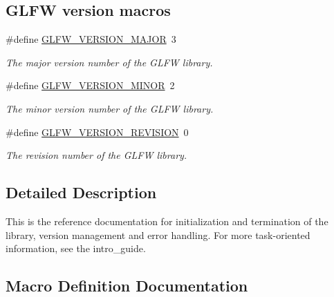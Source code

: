 \subsection*{G\+L\+FW version macros}
\begin{DoxyCompactItemize}
\item 
\#define \hyperlink{group__init_ga6337d9ea43b22fc529b2bba066b4a576}{G\+L\+F\+W\+\_\+\+V\+E\+R\+S\+I\+O\+N\+\_\+\+M\+A\+J\+OR}~3
\begin{DoxyCompactList}\small\item\em The major version number of the G\+L\+FW library. \end{DoxyCompactList}\item 
\#define \hyperlink{group__init_gaf80d40f0aea7088ff337606e9c48f7a3}{G\+L\+F\+W\+\_\+\+V\+E\+R\+S\+I\+O\+N\+\_\+\+M\+I\+N\+OR}~2
\begin{DoxyCompactList}\small\item\em The minor version number of the G\+L\+FW library. \end{DoxyCompactList}\item 
\#define \hyperlink{group__init_gab72ae2e2035d9ea461abc3495eac0502}{G\+L\+F\+W\+\_\+\+V\+E\+R\+S\+I\+O\+N\+\_\+\+R\+E\+V\+I\+S\+I\+ON}~0
\begin{DoxyCompactList}\small\item\em The revision number of the G\+L\+FW library. \end{DoxyCompactList}\end{DoxyCompactItemize}


\subsection{Detailed Description}
This is the reference documentation for initialization and termination of the library, version management and error handling. For more task-\/oriented information, see the intro\+\_\+guide. 

\subsection{Macro Definition Documentation}
\mbox{\label{group__init_ga6337d9ea43b22fc529b2bba066b4a576}} 
